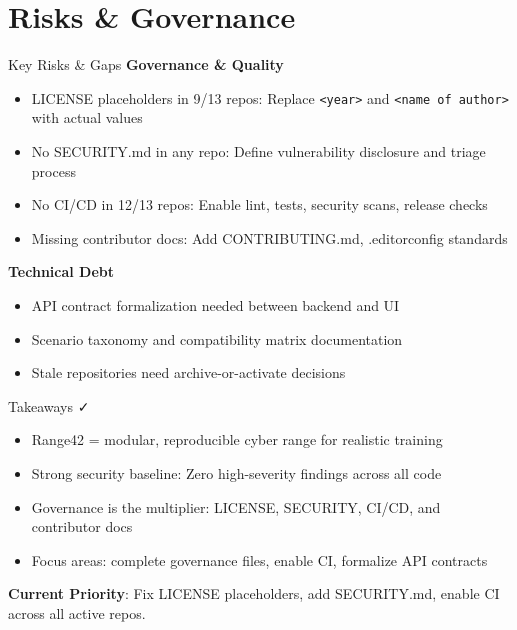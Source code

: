 \documentclass[aspectratio=169]{beamer}
\begin{document}
\section{Risks \& Governance}

\begin{frame}{Key Risks \& Gaps \; \faExclamationTriangle}
  \textbf{Governance \& Quality}
  \begin{itemize}
    \item \alert{LICENSE placeholders in 9/13 repos}: Replace \texttt{<year>} and \texttt{<name of author>} with actual values
    \item \alert{No SECURITY.md in any repo}: Define vulnerability disclosure and triage process
    \item \alert{No CI/CD in 12/13 repos}: Enable lint, tests, security scans, release checks
    \item \alert{Missing contributor docs}: Add CONTRIBUTING.md, .editorconfig standards
  \end{itemize}
  \vspace{2mm}
  \textbf{Technical Debt}
  \begin{itemize}
    \item API contract formalization needed between backend and UI
    \item Scenario taxonomy and compatibility matrix documentation
    \item Stale repositories need archive-or-activate decisions
  \end{itemize}
\end{frame}

\begin{frame}{Takeaways \; \faCheck}
  \begin{itemize}
    \item Range42 = modular, reproducible cyber range for realistic training
    \item \alert{Strong security baseline}: Zero high-severity findings across all code
    \item \alert{Governance is the multiplier}: LICENSE, SECURITY, CI/CD, and contributor docs
    \item Focus areas: complete governance files, enable CI, formalize API contracts
  \end{itemize}
  \vspace{3mm}
  \begin{tcolorbox}
    \faLightbulb\; \textbf{Current Priority}: Fix LICENSE placeholders, add SECURITY.md, enable CI across all active repos.
  \end{tcolorbox}
\end{frame}
\end{document}
